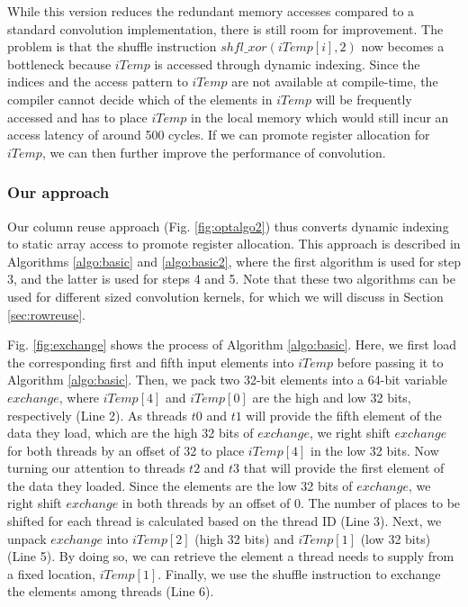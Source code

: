 While this version reduces the redundant memory accesses compared to a standard convolution implementation, there is still room for improvement.
The problem is that the shuffle instruction $shfl\_xor(iTemp[i],2)$ now becomes a bottleneck because $iTemp$ is accessed through dynamic indexing.
Since the indices and the access pattern to $iTemp$ are not available at compile-time, the compiler cannot decide which of the elements in $iTemp$ will be frequently accessed and has to place $iTemp$ in the local memory which would still incur an access latency of around 500 cycles.
If we can promote register allocation for $iTemp$, we can then further improve the performance of convolution.

\subsubsection{Our approach}
Our column reuse approach (Fig. \ref {fig:optalgo2}) thus converts dynamic indexing to static array access to promote register
allocation. This approach is described in Algorithms \ref{algo:basic} and \ref{algo:basic2}, where the first algorithm is used for step 3,
and the latter is used for steps 4 and 5. Note that these two algorithms can be used for different sized convolution kernels, for which we
will discuss in Section \ref {sec:rowreuse}.

Fig. \ref{fig:exchange} shows the process of Algorithm \ref{algo:basic}. Here, we first load the corresponding first and fifth input
elements into $iTemp$ before passing it to Algorithm \ref{algo:basic}. Then, we pack two 32-bit elements into a 64-bit variable $exchange$,
where $iTemp[4]$ and $iTemp[0]$ are the high and low 32 bits, respectively (Line 2). As threads $t0$ and $t1$ will provide the fifth
element of the data they load, which are the high 32 bits of $exchange$, we right shift $exchange$ for both threads by an offset of 32 to
place $iTemp[4]$ in the low 32 bits. Now turning our attention to threads $t2$ and $t3$ that will provide the first element of the data
they loaded. Since the elements are the low 32 bits of $exchange$, we right shift $exchange$ in both threads by an offset of 0. The number
of places to be shifted for each thread is calculated based on the thread ID (Line 3). Next, we unpack $exchange$ into $iTemp[2]$ (high 32
bits) and $iTemp[1]$ (low 32 bits) (Line 5). By doing so, we can retrieve the element a thread needs to supply from a fixed location,
$iTemp[1]$. Finally, we use the shuffle instruction to exchange the elements among threads (Line 6).

